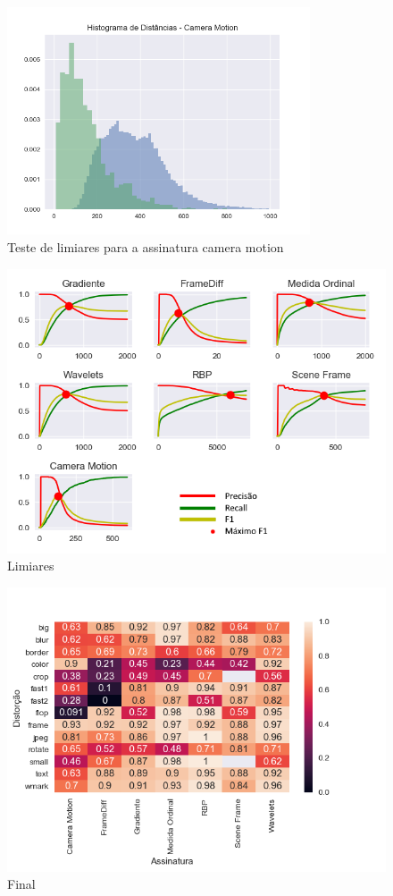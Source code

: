 \begin{figure}[h]
	\centering
	\label{fig:limiares-camera-motion}
	\caption{Teste de limiares para a assinatura camera motion}
	\includegraphics[width=0.8\textwidth]{dados/figuras/experimentos/histograma_Camera_Motion.png}
\end{figure}

\begin{figure}[h]
	\centering
	\label{fig:limiares}
	\caption{Limiares}
	\includegraphics[width=\textwidth]{dados/figuras/experimentos/todos_final.png}
\end{figure}



\begin{figure}[h]
	\centering
	\label{fig:final_heatmap}
	\caption{Final}
	\includegraphics[width=\textwidth]{dados/figuras/experimentos/heatmap_final.png}
\end{figure}